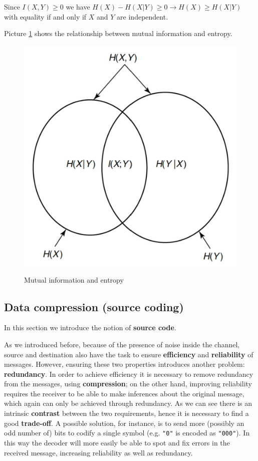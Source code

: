 Since $I(X,Y) \geq 0$ we have $H(X) - H(X|Y) \geq 0 \rightarrow H(X) \geq H(X|Y)$  with equality if and only if $X$ and $Y$ are independent.

Picture \ref{mi} shows the relationship between mutual information and entropy.

\begin{figure}[h!]
		\centering
        \includegraphics[scale = 0.5]{img/mutual information and entropy.jpg}
		\label{mi}
        \caption{Mutual information and entropy}
\end{figure}

\subsection{Data compression (source coding)}
In this section we introduce the notion of \textbf{source code}.


As we introduced before, because of the presence of noise inside the channel, source and destination also have the task to ensure \textbf{efficiency} and \textbf{reliability} of messages. However, ensuring these two properties introduces another problem: \textbf{redundancy}. In order to achieve efficiency it is necessary to remove redundancy from the messages, using \textbf{compression}; on the other hand, improving reliability requires the receiver to be able to make inferences about the original message, which again can only be achieved through redundancy. As we can see there is an intrinsic \textbf{contrast} between the two requirements, hence it is necessary to find a good \textbf{trade-off}. A possible solution, for instance, is to send more (possibly an odd number of) bits to codify a single symbol (e.g. \verb|"0"| is encoded as \verb|"000"|). In this way the decoder will more easily be able to spot and fix errors in the received message, increasing reliability as well as redundancy.


